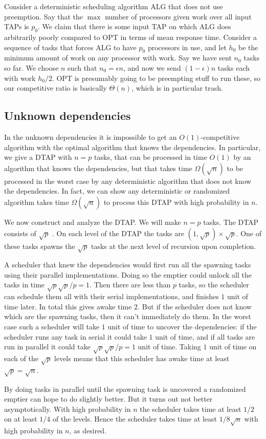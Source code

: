 Consider a deterministic scheduling algorithm ALG that does not
use preemption. Say that the $\max$ number of processors given
work over all input TAPs is $p_0$. We claim that there is some
input TAP on which ALG does arbitrarily poorly compared to OPT in
terms of mean response time.
Consider a sequence of tasks that forces ALG to have $p_0$
processors in use, and let $h_0$ be the minimum amount of work on
any processor with work. Say we have sent $n_0$ tasks so far.
We choose $n$ such that $n_0 = \epsilon n$, and now we send
$(1-\epsilon)n$ tasks each with work $h_0/2$. OPT is presumably
going to be preempting stuff to run these, so our competitive
ratio is basically $\Theta(n)$, which is in particular trash.

\subsection{Unknown dependencies}
In the unknown dependencies it is impossible to get an
$O(1)$-competitive algorithm with the optimal algorithm that
knows the dependencies.
In particular, we give a DTAP with $n=p$ tasks, that can be
processed in time $O(1)$ by an algorithm that knows the
dependencies, but that takes time
$\Omega(\sqrt{n})$ to be processed in the worst
case by any deterministic algorithm that does not know the
dependencies.
In fact, we can show any deterministic or randomized algorithm
takes time $\Omega(\sqrt{n})$ to process this DTAP with high
probability in $n$.

We now construct and analyze the DTAP. We will make $n=p$ tasks.
The DTAP consists of $\sqrt{p}$ . On each level of
the DTAP the tasks are $(1,\sqrt{p})\times \sqrt{p}$. One of
these tasks spawns the $\sqrt{p}$ tasks at the next level of
recursion upon completion.

A scheduler that knew the dependencies would first run all the
spawning tasks using their parallel implementations. Doing so the
emptier could unlock all the tasks in time $\sqrt{p} \sqrt{p} / p
= 1$. Then there are less than $p$ tasks, so the scheduler can
schedule them all with their serial implementations, and finishes
$1$ unit of time later. In total this gives awake time $2$.
But if the scheduler does not know which are the spawning tasks,
then it can't immediately do them. In the worst case such a
scheduler will take $1$ unit of time to uncover the dependencies:
if the scheduler runs any task in serial it could take $1$ unit
of time, and if all tasks are run in parallel it could take
$\sqrt{p}\sqrt{p} / p = 1$ unit of time.
Taking $1$ unit of time on each of the $\sqrt{p}$ levels means
that this scheduler has awake time at least $\sqrt{p} = \sqrt{n}$.

By doing tasks in parallel until the spawning task is uncovered a
randomized emptier can hope to do slightly better. But it turns
out not better asymptotically.
With high probability in $n$ the scheduler takes time at least
$1/2$ on at least $1/4$ of the levels.
Hence the scheduler takes time at least $1/8 \sqrt{n}$ with high
probability in $n$, as desired.

